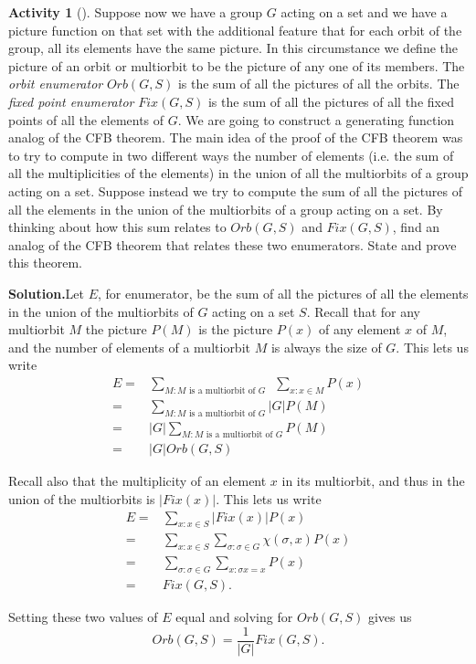 \documentclass[10pt,]{book}
\theoremstyle{plain}
\theoremstyle{definition}
\newtheorem{activity}[project]{Activity}
\numberwithin{equation}{chapter}
\newcommand{\amp}{&}
\begin{document}
\begin{activity}[]\label{Orbit-FixedPoint}
Suppose now we have a group \(G\) acting on a set and we have a picture function on that set with the additional feature that for each orbit of the group, all its elements have the same picture. In this circumstance we define the picture of an orbit or multiorbit to be the picture of any one of its members. The \emph{orbit enumerator} \({ Orb}(G,S)\) is the sum of all the pictures of all the orbits. The \emph{fixed point enumerator} \({ Fix}(G,S)\) is the sum of all the pictures of all the fixed points of all the elements of \(G\). We are going to construct a generating function analog of the CFB theorem. The main idea of the proof of the CFB theorem was to try to compute in two different ways the number of elements (i.e. the sum of all the multiplicities of the elements) in the union of all the multiorbits of a group acting on a set. Suppose instead we try to compute the sum of all the pictures of all the elements in the union of the multiorbits of a group acting on a set. By thinking about how this sum relates to \({ Orb}(G,S)\) and \({ Fix}(G,S)\), find an analog of the CFB theorem that relates these two enumerators. State and prove this theorem.%
\par\medskip\noindent%
\textbf{Solution.}\quad Let \(E\), for enumerator, be the sum of all the pictures of all the elements in the union of the multiorbits of \(G\) acting on a set \(S\). Recall that for any multiorbit \(M\) the picture \(P(M)\) is the picture \(P(x)\) of any element \(x\) of \(M\), and the number of elements of a multiorbit \(M\) is always the size of \(G\). This lets us write%
\begin{align*}
E =\amp \sum_{M:M\mbox{\ is a multiorbit of \(G\)\ \ } }\sum_{x:x\in M} P(x)\\
=\amp \sum_{M:M\mbox{\ is a multiorbit of \(G\)}  }|G|P(M)\\
=\amp |G|\sum_{M:M\mbox{\ is a multiorbit  of \(G\)} } P(M)\\
=\amp |G|{ Orb}(G,S)
\end{align*}
%
\par
Recall also that the multiplicity of an element \(x\) in its multiorbit, and thus in the union of the multiorbits is \(|Fix(x)|\). This lets us write%
\begin{align*}
E =\amp \sum_{x: x\in S} {|Fix}(x)|P(x)\\
=\amp \sum_{x:x\in S}\sum_{\sigma: \sigma \in G} \chi(\sigma,x)P(x)\\
=\amp \sum_{\sigma: \sigma\in G}\sum_{x: \sigma{x}=x} P(x)\\
=\amp  { Fix}(G,S).
\end{align*}
%
\par
Setting these two values of \(E\) equal and solving for \({ Orb}(G,S)\) gives us%
\begin{equation*}
{ Orb}(G,S) =\frac{1}{|G|}{ Fix}(G,S).
\end{equation*}
%
\end{activity}
\end{document}
